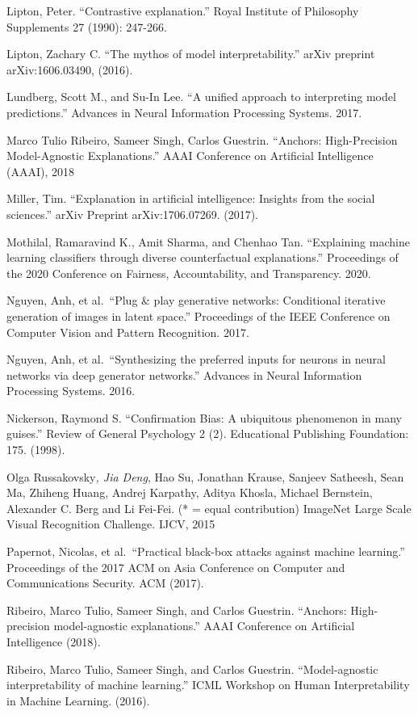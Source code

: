 \documentclass[
  12pt,
]{krantz}
\begin{document}
Lipton, Peter. ``Contrastive explanation.'' Royal Institute of Philosophy Supplements 27 (1990): 247-266.

Lipton, Zachary C. ``The mythos of model interpretability.'' arXiv preprint arXiv:1606.03490, (2016).

Lundberg, Scott M., and Su-In Lee. ``A unified approach to interpreting model predictions.'' Advances in Neural Information Processing Systems. 2017.

Marco Tulio Ribeiro, Sameer Singh, Carlos Guestrin. ``Anchors: High-Precision Model-Agnostic Explanations.'' AAAI Conference on Artificial Intelligence (AAAI), 2018

Miller, Tim. ``Explanation in artificial intelligence: Insights from the social sciences.'' arXiv Preprint arXiv:1706.07269. (2017).

Mothilal, Ramaravind K., Amit Sharma, and Chenhao Tan. ``Explaining machine learning classifiers through diverse counterfactual explanations.'' Proceedings of the 2020 Conference on Fairness, Accountability, and Transparency. 2020.

Nguyen, Anh, et al.~``Plug \& play generative networks: Conditional iterative generation of images in latent space.'' Proceedings of the IEEE Conference on Computer Vision and Pattern Recognition. 2017.

Nguyen, Anh, et al.~``Synthesizing the preferred inputs for neurons in neural networks via deep generator networks.'' Advances in Neural Information Processing Systems. 2016.

Nickerson, Raymond S. ``Confirmation Bias: A ubiquitous phenomenon in many guises.'' Review of General Psychology 2 (2). Educational Publishing Foundation: 175. (1998).

Olga Russakovsky\emph{, Jia Deng}, Hao Su, Jonathan Krause, Sanjeev Satheesh, Sean Ma, Zhiheng Huang, Andrej Karpathy, Aditya Khosla, Michael Bernstein, Alexander C. Berg and Li Fei-Fei. (* = equal contribution) ImageNet Large Scale Visual Recognition Challenge. IJCV, 2015

Papernot, Nicolas, et al.~``Practical black-box attacks against machine learning.'' Proceedings of the 2017 ACM on Asia Conference on Computer and Communications Security. ACM (2017).

Ribeiro, Marco Tulio, Sameer Singh, and Carlos Guestrin. ``Anchors: High-precision model-agnostic explanations.'' AAAI Conference on Artificial Intelligence (2018).

Ribeiro, Marco Tulio, Sameer Singh, and Carlos Guestrin. ``Model-agnostic interpretability of machine learning.'' ICML Workshop on Human Interpretability in Machine Learning. (2016).
\end{document}
